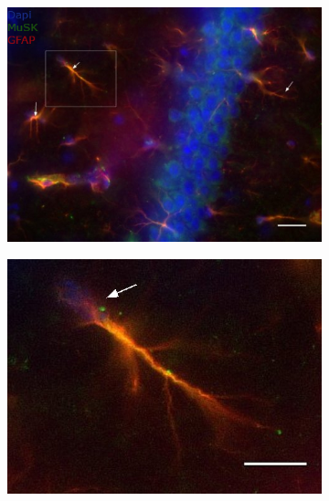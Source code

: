 \begin{figure}[h]
\begin{subfigure}[h]{0.329\textwidth}
			\includegraphics[width=\textwidth]{./Images/Immuno/Musk/MuSK-GFAP/M439_Mut_MuSK_GFAP.jpg}
		\end{subfigure}
		\begin{subfigure}[h]{0.329\textwidth}
			\caption{}
			\label{fig:ColocZoom}
			\includegraphics[width=\textwidth]{./Images/Immuno/Musk/MuSK-GFAP/zoom10um.jpg}
		\end{subfigure}
		\begin{subfigure}[h]{0.329\textwidth}
			\caption{}
			\label{fig:MuSKME}

\end{subfigure}
\end{figure}
